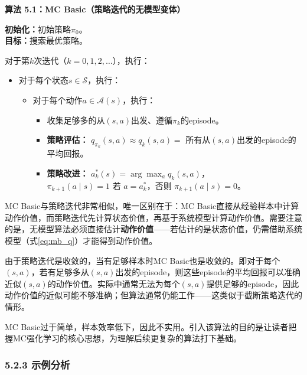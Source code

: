 \documentclass[UTF8]{article}
\begin{document}
\begin{definitionbox}
    \textbf{算法 5.1：MC Basic（策略迭代的无模型变体）}

    \textbf{初始化：}初始策略$\pi_0$。\\
    \textbf{目标：}搜索最优策略。

    对于第$k$次迭代（$k = 0,1,2,\ldots$），执行：
    \begin{itemize}
        \item 对于每个状态$s \in \mathcal{S}$，执行：
        \begin{itemize}
            \item 对于每个动作$a \in \mathcal{A}(s)$，执行：
            \begin{itemize}
                \item 收集足够多的从$(s,a)$出发、遵循$\pi_k$的episode。
                \item \textbf{策略评估：}
                $q_{\pi_k}(s,a) \approx q_k(s,a) = $ 所有从$(s,a)$出发的episode的平均回报。
                \item \textbf{策略改进：}
                $a_k^*(s) = \arg\max_a q_k(s,a)$，\\
                $\pi_{k+1}(a \mid s) = 1$ 若 $a = a_k^*$，否则 $\pi_{k+1}(a \mid s) = 0$。
            \end{itemize}
        \end{itemize}
    \end{itemize}
\end{definitionbox}

MC Basic与策略迭代非常相似，唯一区别在于：MC Basic直接从经验样本中计算动作价值，而策略迭代先计算状态价值，再基于系统模型计算动作价值。需要注意的是，无模型算法必须直接估计\textbf{动作价值}——若估计的是状态价值，仍需借助系统模型（式\eqref{eq:mb_q}）才能得到动作价值。

由于策略迭代是收敛的，当有足够样本时MC Basic也是收敛的。即对于每个$(s,a)$，若有足够多从$(s,a)$出发的episode，则这些episode的平均回报可以准确近似$(s,a)$的动作价值。实际中通常无法为每个$(s,a)$提供足够的episode，因此动作价值的近似可能不够准确；但算法通常仍能工作——这类似于截断策略迭代的情形。

MC Basic过于简单，样本效率低下，因此不实用。引入该算法的目的是让读者把握MC强化学习的核心思想，为理解后续更复杂的算法打下基础。

\subsubsection*{5.2.3 示例分析}
\end{document}
